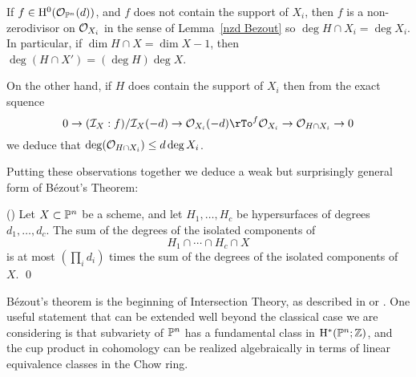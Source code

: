{If $f \in \HH^{0}(\cO_{\PP^{n}}(d))$, and $f$ does not contain the support of $X_{i}$, then
$f$ is a non-zerodivisor on $\cO_{X_{i}}$ in the sense of
Lemma~\ref{nzd Bezout} so $\deg H\cap X_{i} = \deg X_{i}$. 
In particular, if $\dim H\cap X = \dim X -1$, then
$\deg(H\cap X') = (\deg H)\deg X$. 

On the other hand, if $H$ does contain the
support of $X_{i}$ then from the exact squence
$$
0\to (\cI_{X}:f)/\cI_{X}(-d) \to \cO_{X_{i}}(-d) \rTo^{f} \cO_{X_{i}} \to \cO_{H\cap X_{i}} \to 0
$$
we deduce that $\deg (\cO_{H\cap X_{i}}) \leq d\deg X_{i}$.

Putting these observations together we deduce a weak but surprisingly general form of B\'ezout's Theorem:

\begin{proposition}(\cite[Exericse 8.4.6]{Fulton})\label {weak Bezout}
Let $X\subset \PP^{n}$ be a scheme, and let $H_{1}, \dots, H_{c}$ be hypersurfaces of degrees $d_{1}, \dots, d_{c}$.
The sum of the degrees of the isolated components of 
$$
H_{1}\cap\cdots\cap H_{c}\cap X
$$
is at most $(\prod_{i}d_{i})$ times the sum of the degrees of the isolated components of $X$. \qed
\end{proposition}

\begin{fact}
B\'ezout's theorem is the beginning of Intersection Theory, as described in \cite{Fulton} or \cite{3264}. One useful statement that can be extended well beyond the classical case we are considering is that
subvariety of $\PP^{n}$ has a fundamental class in $\HH^{*}(\PP^{n}; \ZZ)$, and the cup product in cohomology can be realized algebraically in terms of linear equivalence classes in the Chow ring.
\end{fact}

}
